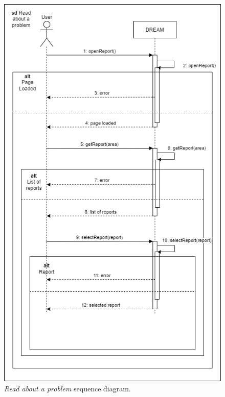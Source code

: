 \begin{figure}[H]
    \centering
    \includegraphics[height=1.5\linewidth]{Images/Use Case/UC5.png}
    \caption{\textit{Read about a problem} sequence diagram.}
\end{figure}
\newpage

